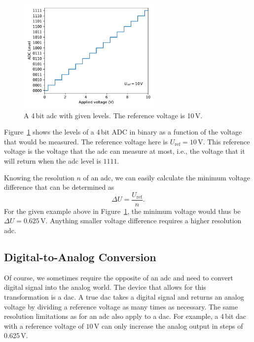 \begin{figure}[tb]
    \centering
    \includegraphics[width=0.625\textwidth]{graphics/00_introduction/adc.pdf}
    \caption{A 4\,bit \ac{adc} with given levels. The reference voltage is 10\,V.}
    \label{fig:intro:adc}
\end{figure}
Figure~\ref{fig:intro:adc} shows the levels of a 4\,bit ADC in binary as a function of the voltage that would be measured. The reference voltage here is $U_\mathrm{ref} = 10\,$V. This reference voltage is the voltage that the \ac{adc} can measure at most, i.e., the voltage that it will return when the \ac{adc} level is $1111$. 

Knowing the resolution $n$ of an \ac{adc}, we can easily calculate the minimum voltage difference that can be determined as 
\begin{equation}
    \Delta U = \frac{U_\mathrm{ref}}{n}.
\end{equation}
For the given example above in Figure~\ref{fig:intro:adc}, the minimum voltage would thus be $\Delta U  = 0.625\,$V. Anything smaller voltage difference requires a higher resolution \ac{adc}.


\subsection{Digital-to-Analog Conversion}\label{sec:intro:dac}

Of course, we sometimes require the opposite of an \ac{adc} and need to convert digital signal into the analog world. The device that allows for this transformation is a \ac{dac}. A true \ac{dac} takes a digital signal and returns an analog voltage by dividing a reference voltage as many times as  necessary. The same resolution limitations as for an \ac{adc} also apply to a \ac{dac}. For example, a 4\,bit \ac{dac} with a reference voltage of $10\,$V can only increase the analog output in steps of 0.625\,V.

